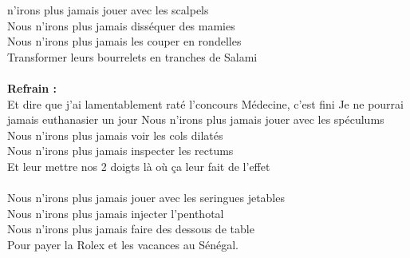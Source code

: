 
 n'irons plus jamais jouer avec les scalpels
\\Nous n'irons plus jamais disséquer des mamies
\\Nous n'irons plus jamais les couper en rondelles
\\Transformer leurs bourrelets en tranches de Salami
\\\\\textbf{Refrain :}
\\
{Et dire que j'ai lamentablement raté l'concours}
{Médecine, c'est fini}
{Je ne pourrai jamais euthanasier un jour}
Nous n'irons plus jamais jouer avec les spéculums
\\Nous n'irons plus jamais voir les cols dilatés
\\Nous n'irons plus jamais inspecter les rectums
\\Et leur mettre nos 2 doigts là où ça leur fait de l'effet
\\\\Nous n'irons plus jamais jouer avec les seringues jetables
\\Nous n'irons plus jamais injecter l'penthotal
\\Nous n'irons plus jamais faire des dessous de table
\\Pour payer la Rolex et les vacances au Sénégal.
\\
\breakpage